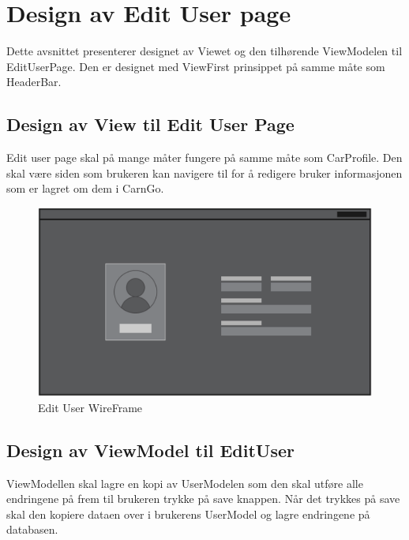 \documentclass[SoftwareDesign/SoftwareDesign_main.tex]{subfiles}
\begin{document}
\section{Design av Edit User page}
Dette avsnittet presenterer designet av Viewet og den tilhørende ViewModelen til EditUserPage. Den er designet med ViewFirst prinsippet på samme måte som HeaderBar.
\subsection{Design av View til Edit User Page}
Edit user page skal på mange måter fungere på samme måte som CarProfile. Den skal være siden som brukeren kan navigere til for å redigere bruker informasjonen som er lagret om dem i CarnGo.

\begin{figure}[H]
    \centering
    \includegraphics[width=\textwidth]{SoftwareDesign/MVVMDesigns/Graphics/EditUserPage.png}
    \caption{Edit User WireFrame}
    \label{fig:EditUserWireFrame}
\end{figure}


\subsection{Design av ViewModel til EditUser}
ViewModellen skal lagre en kopi av UserModelen som den skal utføre alle endringene på frem til brukeren trykke på save knappen. Når det trykkes på save skal den kopiere dataen over i brukerens UserModel og lagre endringene på databasen.
\end{document}
